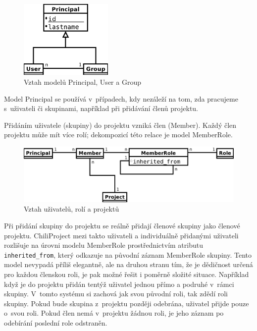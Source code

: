 \documentclass[thesis=B,czech]{FITthesis}[2012/05/02]
\begin{document}
\begin{figure}[htbp]
\centering
\includegraphics[width=0.4\textwidth]{group-er1.pdf}
\caption{Vztah modelů Principal, User a Group}
\end{figure}

Model Principal se používá v~případech, kdy nezáleží na tom, zda pracujeme
s~uživateli či skupinami, například při přidávání členů projektu.

Přidáním uživatele (skupiny) do projektu vzniká člen (Member). Každý
člen projektu může mít více rolí; dekompozicí této relace je model
\mbox{MemberRole}.

\begin{figure}[htbp]
\centering
\includegraphics[width=1\textwidth]{group-er2.pdf}
\caption{Vztah uživatelů, rolí a projektů}
\end{figure}

Při přidání skupiny do projektu se reálně přidají členové skupiny jako
členové projektu. ChiliProject mezi takto  uživateli a
individuálně přidanými uživateli rozlišuje na úrovni modelu MemberRole
prostřednictvím atributu \lstinline!inherited_from!, který odkazuje na
původní záznam MemberRole skupiny. Tento model nevypadá příliš
elegantně, ale na druhou stranu tím, že je dědičnost určená pro každou
členskou roli, je pak možné řešit i poměrně složité situace. Například
když je do projektu přidán tentýž uživatel jednou přímo a podruhé v~rámci
skupiny. V~tomto systému si zachová jak svou původní roli, tak zdědí roli
skupiny. Pokud bude skupina z~projektu později odebrána, uživatel
přijde pouze o~svou roli. Pokud člen nemá v~projektu žádnou roli, je jeho
záznam po odebírání poslední role odstraněn.
\end{document}
